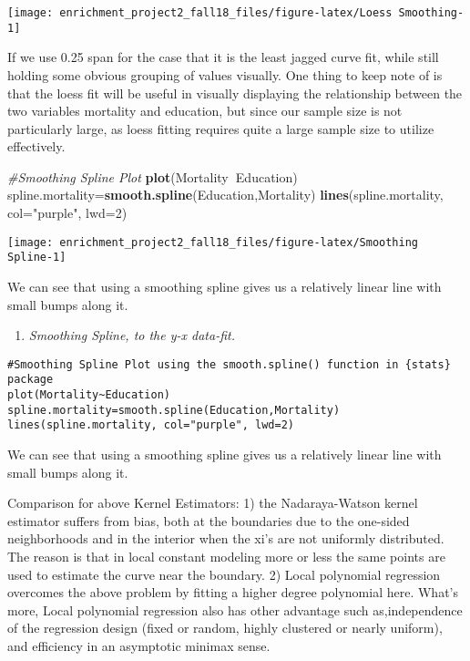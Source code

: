 \documentclass[]{article}
\newenvironment{Shaded}{\begin{snugshade}}{\end{snugshade}}
\newcommand{\KeywordTok}[1]{\textcolor[rgb]{0.13,0.29,0.53}{\textbf{#1}}}
\newcommand{\DataTypeTok}[1]{\textcolor[rgb]{0.13,0.29,0.53}{#1}}
\newcommand{\DecValTok}[1]{\textcolor[rgb]{0.00,0.00,0.81}{#1}}
\newcommand{\StringTok}[1]{\textcolor[rgb]{0.31,0.60,0.02}{#1}}
\newcommand{\CommentTok}[1]{\textcolor[rgb]{0.56,0.35,0.01}{\textit{#1}}}
\newcommand{\OperatorTok}[1]{\textcolor[rgb]{0.81,0.36,0.00}{\textbf{#1}}}
\newcommand{\NormalTok}[1]{#1}
\providecommand{\tightlist}{%
  \setlength{\itemsep}{0pt}\setlength{\parskip}{0pt}}
\begin{document}
\begin{center}\texttt{[image: enrichment\_project2\_fall18\_files/figure-latex/Loess Smoothing-1]} \end{center}

If we use 0.25 span for the case that it is the least jagged curve fit,
while still holding some obvious grouping of values visually. One thing
to keep note of is that the loess fit will be useful in visually
displaying the relationship between the two variables mortality and
education, but since our sample size is not particularly large, as loess
fitting requires quite a large sample size to utilize effectively.

\begin{Shaded}
\begin{Highlighting}[]
\CommentTok{#Smoothing Spline Plot}
\KeywordTok{plot}\NormalTok{(Mortality}\OperatorTok{~}\NormalTok{Education)}
\NormalTok{spline.mortality=}\KeywordTok{smooth.spline}\NormalTok{(Education,Mortality)}
\KeywordTok{lines}\NormalTok{(spline.mortality, }\DataTypeTok{col=}\StringTok{"purple"}\NormalTok{, }\DataTypeTok{lwd=}\DecValTok{2}\NormalTok{)}
\end{Highlighting}
\end{Shaded}

\begin{center}\texttt{[image: enrichment\_project2\_fall18\_files/figure-latex/Smoothing Spline-1]} \end{center}

We can see that using a smoothing spline gives us a relatively linear
line with small bumps along it.

\begin{enumerate}
\def\labelenumi{\arabic{enumi})}
\setcounter{enumi}{3}
\tightlist
\item
  \emph{Smoothing Spline, to the y-x data-fit.}
\end{enumerate}

\begin{verbatim}
#Smoothing Spline Plot using the smooth.spline() function in {stats} package
plot(Mortality~Education)
spline.mortality=smooth.spline(Education,Mortality)
lines(spline.mortality, col="purple", lwd=2)
\end{verbatim}

We can see that using a smoothing spline gives us a relatively linear
line with small bumps along it.

Comparison for above Kernel Estimators: 1) the Nadaraya-Watson kernel
estimator suffers from bias, both at the boundaries due to the one-sided
neighborhoods and in the interior when the xi's are not uniformly
distributed. The reason is that in local constant modeling more or less
the same points are used to estimate the curve near the boundary. 2)
Local polynomial regression overcomes the above problem by fitting a
higher degree polynomial here. What's more, Local polynomial regression
also has other advantage such as,independence of the regression design
(ﬁxed or random, highly clustered or nearly uniform), and eﬃciency in an
asymptotic minimax sense.
\end{document}
